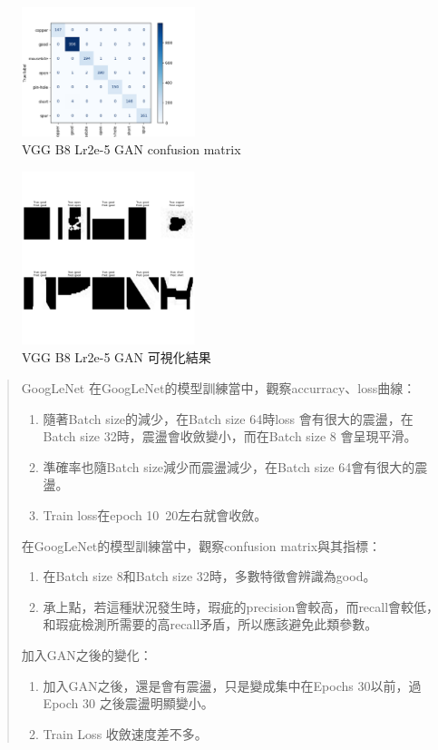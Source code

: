 \begin{figure}[htbp]
    \centering
    \includegraphics[width=0.45\textwidth]{./img/VGG/P9.png}
    \caption{VGG B8 Lr2e-5 GAN confusion matrix}
    \label{fig:VGG_P9}
\end{figure}
\begin{figure}[htbp]
    \centering
    \includegraphics[width=0.45\textwidth]{./img/VGG/P10.png}
    \caption{VGG B8 Lr2e-5 GAN 可視化結果}
    \label{fig:VGG_P10}
\end{figure}
%
\begin{abstract}
    GoogLeNet
    在GoogLeNet的模型訓練當中，觀察accurracy、loss曲線：
    \begin{enumerate}[1.]
        \item 隨著Batch size的減少，在Batch size 64時loss 會有很大的震盪，在Batch size 32時，震盪會收斂變小，而在Batch size 8 會呈現平滑。
        \item 準確率也隨Batch size減少而震盪減少，在Batch size 64會有很大的震盪。
        \item Train loss在epoch 10~20左右就會收斂。
    \end{enumerate}
    在GoogLeNet的模型訓練當中，觀察confusion matrix與其指標：
    \begin{enumerate}[1.]
        \item 在Batch size 8和Batch size 32時，多數特徵會辨識為good。
        \item 承上點，若這種狀況發生時，瑕疵的precision會較高，而recall會較低，和瑕疵檢測所需要的高recall矛盾，所以應該避免此類參數。
    \end{enumerate}
    加入GAN之後的變化：
    \begin{enumerate}[1.]
        \item 加入GAN之後，還是會有震盪，只是變成集中在Epochs 30以前，過Epoch 30 之後震盪明顯變小。
        \item Train Loss 收斂速度差不多。
    \end{enumerate}
\end{abstract}
